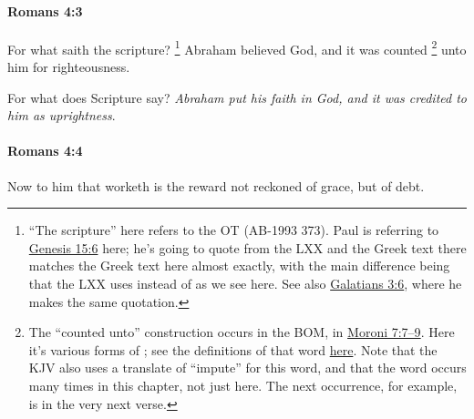 		\paragraph{Romans 4:3} %
			\label{ROMANS-4-3}

			For what saith the scripture?%
				\footnote{%
					\label{ROMANS-4-3-scripture}%
					``The scripture'' here refers to the OT (AB-1993 373). Paul is referring to \hyperref[GENESIS-15-6]{Genesis 15:6} here; he's going to quote from the LXX and the Greek text there matches the Greek text here almost exactly, with the main difference being that the LXX uses  instead of  as we see here. See also \hyperref[GALATIANS-3-6]{Galatians 3:6}, where he makes the same quotation.
					}
			Abraham believed God, and it was counted%
				\footnote{%
					\label{ROMANS-4-3-counted}%
					The ``counted unto'' construction occurs in the BOM, in \hyperref[MORONI-7-7]{Moroni 7:7--9}. Here it's various forms of ; see the definitions of that word \hyperref[LOGIZOMAI]{here}. Note that the KJV also uses a translate of ``impute'' for this word, and that the word occurs many times in this chapter, not just here. The next occurrence, for example, is in the very next verse.
					}
			unto him for righteousness.

			\begin{framed}
			\scriptsize
				\begin{compactdesc}
					\item[SBLG]  \hyperref[LOGIZOMAI]{} 
					\item[AB-1993 369] For what does Scripture say? \textit{Abraham put his faith in God, and it was credited to him as uprightness}.
				\end{compactdesc}
			\end{framed}

		\paragraph{Romans 4:4} %
			\label{ROMANS-4-4}

			Now to him that worketh is the reward not reckoned of grace, but of debt.

